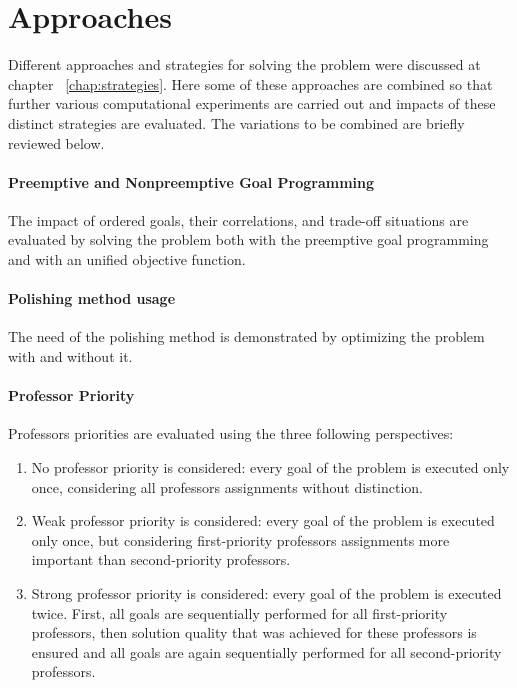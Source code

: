 \section{Approaches}

Different approaches and strategies for solving the problem were discussed at chapter ~\ref{chap:strategies}. Here some of these approaches are combined so that further various computational experiments are carried out and impacts of these distinct strategies are evaluated. The variations to be combined are briefly reviewed below.

\paragraph{Preemptive and Nonpreemptive Goal Programming}
The impact of ordered goals, their correlations, and trade-off situations are evaluated by solving the problem both with the preemptive goal programming and with an unified objective function.

\paragraph{Polishing method usage}
The need of the polishing method is demonstrated by optimizing the problem with and without it.

\paragraph{Professor Priority}
Professors priorities are evaluated using the three following perspectives:
\begin{enumerate}
\item No professor priority is considered: every goal of the problem is executed only once, considering all professors assignments without distinction.
\item Weak professor priority is considered: every goal of the problem is executed only once, but considering first-priority professors assignments more important than second-priority professors.
\item Strong professor priority is considered: every goal of the problem is executed twice. First, all goals are sequentially performed for all first-priority professors, then solution quality that was achieved for these professors is ensured and all goals are again sequentially performed for all second-priority professors.
\end{enumerate}


